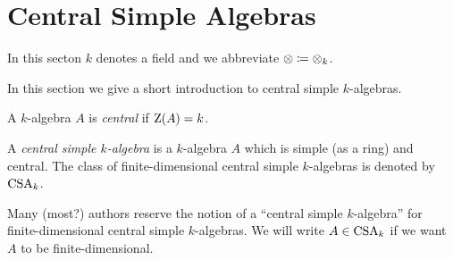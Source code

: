 \section{Central Simple Algebras}


\begin{conventions}
  In this secton $k$ denotes a field and we abbreviate $\otimes \coloneqq \otimes_k$.
\end{conventions}


\begin{fluff}
  In this section we give a short introduction to central simple $k$-algebras.
\end{fluff}


\begin{definition}
  A $k$-algebra $A$ is \emph{central} if $\operatorname{Z}(A) = k$.
\end{definition}


\begin{definition}
  A \emph{central simple $k$-algebra} is a $k$-algebra $A$ which is simple (as a ring) and central.
  The class of finite-dimensional central simple $k$-algebras is denoted by $\operatorname{CSA}_k$.
\end{definition}


\begin{remark}
  Many (most?) authors reserve the notion of a \enquote{central simple $k$-algebra} for finite-dimensional central simple $k$-algebras.
  We will write $A \in \operatorname{CSA}_k$ if we want $A$ to be finite-dimensional.
\end{remark}












